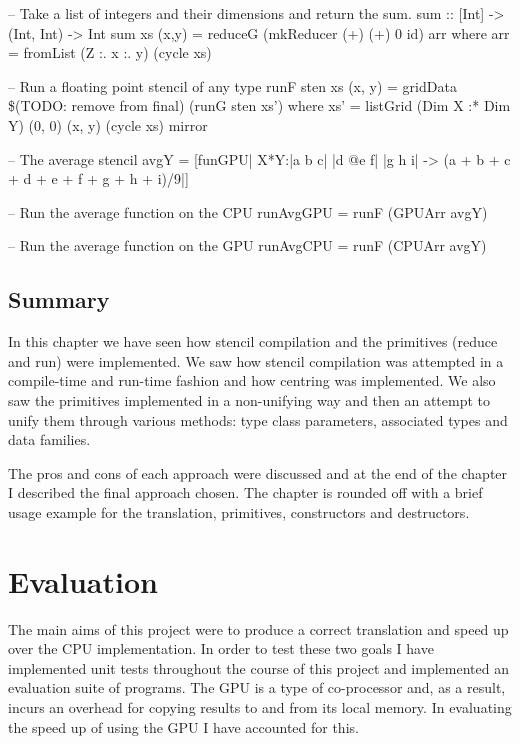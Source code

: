 \documentclass[12pt,a4paper,oneside]{scrbook}
\begin{document}
\begin{hflisting}[label=lst:example,
caption=Usage of the final system taken from the unit tests.]

-- Take a list of integers and their dimensions and return the sum.
sum :: [Int] -> (Int, Int) -> Int
sum xs (x,y) =  reduceG (mkReducer (+) (+) 0 id) arr
    where arr = fromList (Z :. x :. y) (cycle xs)

-- Run a floating point stencil of any type
runF sten xs (x, y) = gridData \$(TODO: remove from final) (runG sten xs')
    where xs' = listGrid (Dim X :* Dim Y)
                         (0, 0) (x, y)
                         (cycle xs)
                         mirror

-- The average stencil
avgY = [funGPU| X*Y:|a  b c|
                    |d @e f|
                    |g  h i| ->
        (a + b + c + d + e + f + g + h + i)/9|]

-- Run the average function on the CPU
runAvgGPU = runF (GPUArr avgY)

-- Run the average function on the GPU
runAvgCPU = runF (CPUArr avgY)

\end{hflisting}



\section{Summary}

In this chapter we have seen how stencil compilation and the primitives (reduce
and run) were implemented. We saw how stencil compilation was attempted in a
compile-time and run-time fashion and how centring was implemented. We also saw
the primitives implemented in a non-unifying way and then an attempt to unify
them through various methods: type class parameters, associated types and data
families.

The pros and cons of each approach were discussed and at the end of the chapter
I described the final approach chosen. The chapter is rounded off with a brief
usage example for the translation, primitives, constructors and destructors.

\chapter{Evaluation}

The main aims of this project were to produce a correct translation and speed up
over the CPU implementation. In order to test these two goals I have implemented
unit tests throughout the course of this project and implemented an evaluation
suite of programs. The GPU is a type of co-processor and, as a result, incurs an
overhead for copying results to and from its local memory. In evaluating the
speed up of using the GPU I have accounted for this.
\end{document}
